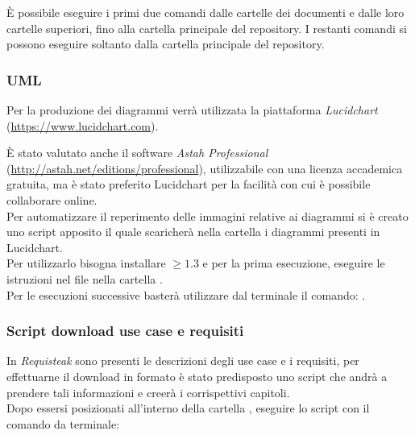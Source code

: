 È possibile eseguire i primi due comandi dalle cartelle dei documenti e dalle loro cartelle superiori, fino alla cartella principale del repository. I restanti comandi si possono eseguire soltanto dalla cartella principale del repository.

\subsubsection{UML}
		
	Per la produzione dei diagrammi \emph{} verrà utilizzata la piattaforma \emph{Lucidchart}
	(\url{https://www.lucidchart.com}).
		
	È stato valutato anche il software \emph{Astah Professional} (\url{http://astah.net/editions/professional}), utilizzabile con
	una licenza accademica gratuita, ma è stato preferito Lucidchart per la facilità con cui è possibile collaborare online.\\
		
	Per automatizzare il reperimento delle immagini relative ai diagrammi  si è creato uno script apposito il quale
	scaricherà nella cartella  i diagrammi presenti in Lucidchart. \\
	Per utilizzarlo bisogna installare  $\geq 1.3$ e per la prima esecuzione, eseguire le istruzioni nel file
	 nella cartella . \\ 
	Per le esecuzioni successive basterà utilizzare dal terminale il comando: .
	
\subsubsection{Script download use case e requisiti}
	In \emph{Requisteak} sono presenti le descrizioni degli use case e i requisiti, per effettuarne il download in formato
	 è stato predisposto uno script che andrà a prendere tali informazioni e creerà i corrispettivi capitoli.\\
	 Dopo essersi posizionati all'interno della cartella , eseguire lo script con il comando da terminale:
	  \\
	

